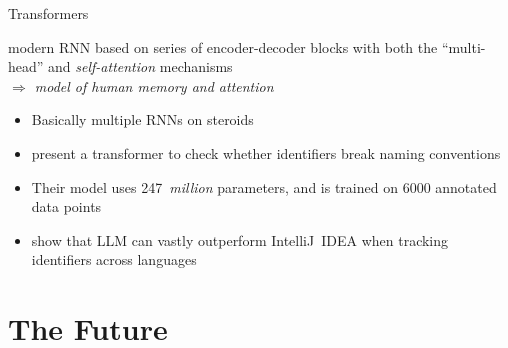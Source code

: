 \begin{frame}{Transformers}
    \begin{description}[Transformers:]
        \setlength{\itemsep}{1.05ex}
        \item[Transformers:]

        modern \ac{RNN} based on series of encoder-decoder blocks with both the
        \enquote{multi-head} and \emph{self-attention}
        mechanisms~\cite{Vaswani2017Transformer} \\
        \emph{$\Longrightarrow$ model of human memory and attention}

    \end{description}

    \begin{itemize}
        \item

        Basically multiple \acsp{RNN} on steroids

        \pause %

        \item

        \citeauthor*{Villmow2023Violations} present a transformer  to check
        whether identifiers break naming conventions

        \item

        Their model uses 247~\emph{million} parameters, and is trained on 6000 annotated
        data points~\cite{Villmow2023Violations}

        \item

        \citeauthor*{Ju2023XLangBinding} show that \acs{LLM} can vastly outperform
        IntelliJ~IDEA when tracking identifiers across languages~\cite{Ju2023XLangBinding}

    \end{itemize}

\end{frame}



\section{The Future}
\label{sec:The-Future}

